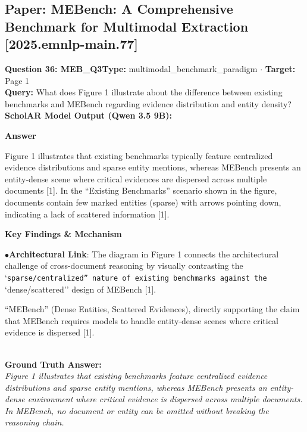 \documentclass[10pt,a4paper]{article}
\begin{document}
\subsection{Paper: MEBench: A Comprehensive Benchmark for Multimodal Extraction [2025.emnlp-main.77]}
\vspace{-4pt}
\begin{tcolorbox}[questionbox]
{\noindent\bfseries\large\color{navy} Question 36: MEB\_Q3}\hfill {\footnotesize\color{darkteal}\textbf{Type:} multimodal\_benchmark\_paradigm $\cdot$ \textbf{Target:} Page 1}\\[4pt]
{\noindent\bfseries\color{accentblue} Query: } What does Figure 1 illustrate about the difference between existing benchmarks and MEBench regarding evidence distribution and entity density?\\[6pt]
{\noindent\bfseries\color{navy} ScholAR Model Output (Qwen 3.5 9B):}\\[2pt]
{\small \noindent \textbf{Answer}\par\vspace{3pt}Figure 1 illustrates that existing benchmarks typically feature centralized evidence distributions and sparse entity mentions, whereas MEBench presents an entity-dense scene where critical evidences are dispersed across multiple documents [1]. In the ``Existing Benchmarks'' scenario shown in the figure, documents contain few marked entities (sparse) with arrows pointing down, indicating a lack of scattered information [1].\par\vspace{3pt}\noindent \textbf{Key Findings \& Mechanism}\par\vspace{3pt}\noindent\hspace*{8pt}$\bullet$\hspace*{4pt}\textbf{Architectural Link}: The diagram in Figure 1 connects the architectural challenge of cross-document reasoning by visually contrasting the `\texttt{sparse/centralized'' nature of existing benchmarks against the }`dense/scattered'' design of MEBench [1].\par\vspace{3pt}``MEBench'' (Dense Entities, Scattered Evidences), directly supporting the claim that MEBench requires models to handle entity-dense scenes where critical evidence is dispersed [1].}\\[6pt]
{\noindent\bfseries\color{darkteal} Ground Truth Answer:}\\[2pt]
{\small\itshape Figure 1 illustrates that existing benchmarks feature centralized evidence distributions and sparse entity mentions, whereas MEBench presents an entity-dense environment where critical evidence is dispersed across multiple documents. In MEBench, no document or entity can be omitted without breaking the reasoning chain.}\\[4pt]

\end{tcolorbox}
\end{document}
